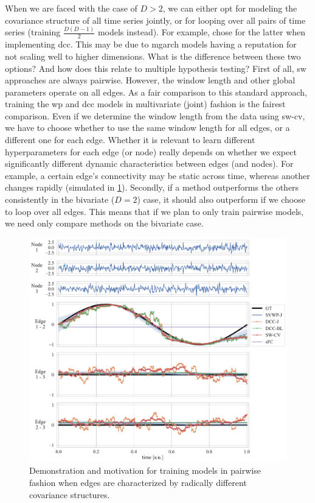 When we are faced with the case of $D > 2$, we can either opt for modeling the covariance structure of all time series jointly, or for looping over all pairs of time series (training $\frac{D (D - 1)}{2}$ models instead).
%
For example, \textcite{Choe2017, Hakimdavoodi2020} chose for the latter when implementing \gls{dcc}.
This may be due to \gls{mgarch} models having a reputation for not scaling well to higher dimensions.
%
What is the difference between these two options?
And how does this relate to multiple hypothesis testing?
First of all, \gls{sw} approaches are always pairwise.
However, the window length and other global parameters operate on all edges.
As a fair comparison to this standard approach, training the \gls{wp} and \gls{dcc} models in multivariate (joint) fashion is the fairest comparison.
Even if we determine the window length from the data using \gls{sw-cv}, we have to choose whether to use the same window length for all edges, or a different one for each edge.
%
Whether it is relevant to learn different hyperparameters for each edge (or node) really depends on whether we expect significantly different dynamic characteristics between edges (and nodes).
For example, a certain edge's connectivity may be static across time, whereas another changes rapidly (simulated in \cref{fig:pairwise-vs-joint}).
%
Secondly, if a method outperforms the others consistently in the bivariate ($D = 2$) case, it should also outperform if we choose to loop over all edges.
This means that if we plan to only train pairwise models, we need only compare methods on the bivariate case.


\begin{figure}[t]
  \centering
  \includegraphics[width=\textwidth]{fig/sim/d3s/N0400_T0003/no_noise/periodic_1_correlations}
  \caption{
    Demonstration and motivation for training models in pairwise fashion when edges are characterized by radically different covariance structures.
  }
  \label{fig:pairwise-vs-joint}
\end{figure}


